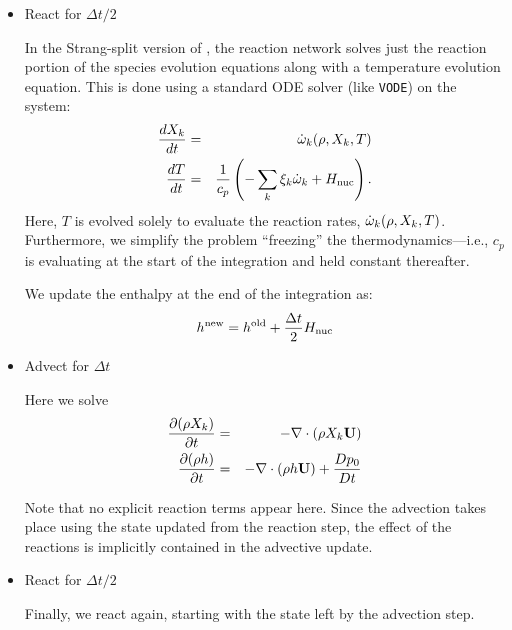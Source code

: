 \begin{itemize}

\item React for $\Delta t/2$

In the Strang-split version of \maestro, the reaction network solves just
the reaction portion of the species evolution equations along with a
temperature evolution equation.  This is done using a standard ODE solver
(like {\tt VODE}) on the system:
\begin{eqnarray}
\frac{dX_k}{dt} &=& \dot{\omega}_k(\rho,X_k,T) \\
\frac{dT}{dt}   &=& 
    \frac{1}{c_p} \left ( -\sum_k \xi_k  \dot{\omega}_k  + {H_{\rm nuc}} \right ).
\end{eqnarray}
Here, $T$ is evolved solely to evaluate the reaction rates,
$\dot{\omega}_k(\rho,X_k,T)$.  Furthermore, we simplify the problem
``freezing'' the thermodynamics---i.e., $c_p$ is evaluating at the
start of the integration and held constant thereafter.

We update the enthalpy at the end of the integration as:
\begin{equation}
h^\mathrm{new} = h^\mathrm{old} + \frac{\Delta t}{2} {H_{\rm nuc}}
\end{equation}

\item Advect for $\Delta t$

Here we solve
\begin{eqnarray}
\frac{\partial(\rho X_k)}{\partial t} &=& 
    -\nabla\cdot(\rho X_k{\bf U}) \\
\frac{\partial(\rho h)}{\partial t} &=& 
    -\nabla\cdot(\rho h{\bf U}) + \frac{Dp_0}{Dt} 
\end{eqnarray}

Note that no explicit reaction terms appear here.  Since the advection
takes place using the state updated from the reaction step, the effect
of the reactions is implicitly contained in the advective update.

\item React for $\Delta t/2$

Finally, we react again, starting with the state left by the advection
step.

\end{itemize}


